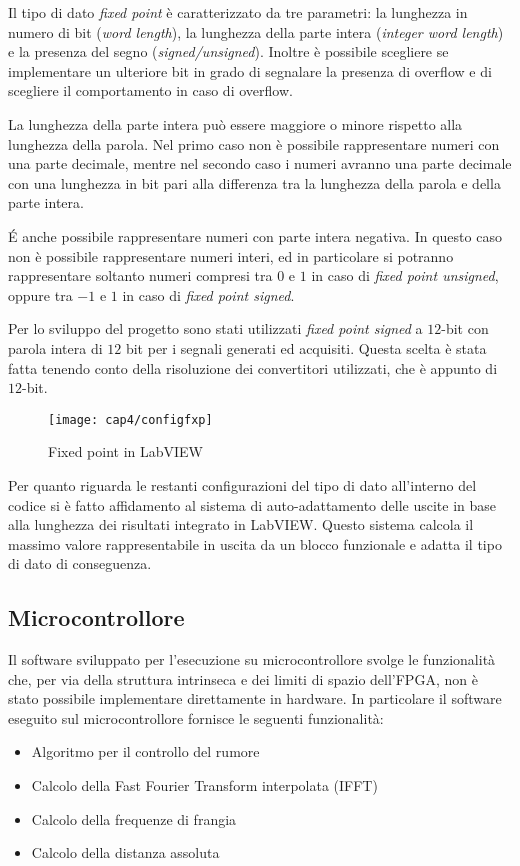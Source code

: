 Il tipo di dato \textit{fixed point} è caratterizzato da tre parametri: la lunghezza in numero di bit (\textit{word length}), la lunghezza della parte intera (\textit{integer word length}) e la presenza del segno (\textit{signed/unsigned}). Inoltre è possibile scegliere se implementare un ulteriore bit in grado di segnalare la presenza di overflow e di scegliere il comportamento in caso di overflow.

La lunghezza della parte intera può essere maggiore o minore rispetto alla lunghezza della parola. Nel primo caso non è possibile rappresentare numeri con una parte decimale, mentre nel secondo caso i numeri avranno una parte decimale con una lunghezza in bit pari alla differenza tra la lunghezza della parola e della parte intera. 

\'E anche possibile rappresentare numeri con parte intera negativa. In questo caso non è possibile rappresentare numeri interi, ed in particolare si potranno rappresentare soltanto numeri compresi tra $0$ e $1$ in caso di \textit{fixed point unsigned}, oppure tra $-1$ e $1$ in caso di \textit{fixed point signed}.

Per lo sviluppo del progetto sono stati utilizzati \textit{fixed point signed} a $12$-bit con parola intera di $12$ bit per i segnali generati ed acquisiti. Questa scelta è stata fatta tenendo conto della risoluzione dei convertitori utilizzati, che è appunto di $12$-bit.

\begin{figure}[H]  
	\begin{center}
		\texttt{[image: cap4/configfxp]}
		\caption{Fixed point in LabVIEW}
		\label{configfxp}
	\end{center}
\end{figure}

Per quanto riguarda le restanti configurazioni del tipo di dato all'interno del codice si è fatto affidamento al sistema di auto-adattamento delle uscite in base alla lunghezza dei risultati integrato in LabVIEW. Questo sistema calcola il massimo valore rappresentabile in uscita da un blocco funzionale e adatta il tipo di dato di conseguenza.


\subsection{Microcontrollore}
Il software sviluppato per l'esecuzione su microcontrollore svolge le funzionalità che, per via della struttura intrinseca e dei limiti di spazio dell'FPGA, non è stato possibile implementare direttamente in hardware. In particolare il software eseguito sul microcontrollore fornisce le seguenti funzionalità:
\begin{itemize}
	\item Algoritmo per il controllo del rumore
	\item Calcolo della Fast Fourier Transform interpolata (IFFT)
	\item Calcolo della frequenze di frangia
	\item Calcolo della distanza assoluta
\end{itemize}

